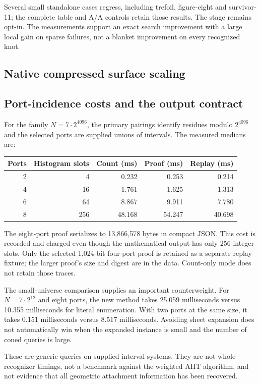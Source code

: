 Several small standalone cases regress, including trefoil, figure-eight
and survivor-11; the complete table and A/A controls retain those results.
The stage remains opt-in. The measurements support an exact search
improvement with a large local gain on sparse failures, not a blanket
improvement on every recognized knot.

\subsection{Native compressed surface scaling}


\subsection{Port-incidence costs and the output contract}

For the family $N=7\cdot2^{4096}$, the primary pairings identify residues
modulo $2^{4096}$ and the selected ports are supplied unions of intervals.
The measured medians are:
\begin{center}
\begin{tabular}{@{}rrrrr@{}}
\toprule Ports & Histogram slots & Count (ms) & Proof (ms) & Replay (ms)\\\midrule
2 & 4 & 0.232 & 0.253 & 0.214\\
4 & 16 & 1.761 & 1.625 & 1.313\\
6 & 64 & 8.867 & 9.911 & 7.780\\
8 & 256 & 48.168 & 54.247 & 40.698\\\bottomrule
\end{tabular}
\end{center}
The eight-port proof serializes to 13,866,578 bytes in compact JSON.
This cost is recorded and charged even though the mathematical output
has only 256 integer slots. Only the selected 1,024-bit four-port proof
is retained as a separate replay fixture; the larger proof's size and
digest are in the data. Count-only mode does not retain those traces.

The small-universe comparison supplies an important counterweight. For
$N=7\cdot2^{12}$ and eight ports, the new method takes 25.059 milliseconds
versus 10.355 milliseconds for literal enumeration. With two ports at the
same size, it takes 0.151 milliseconds versus 8.517 milliseconds. Avoiding
sheet expansion does not automatically win when the expanded instance
is small and the number of coned queries is large.

These are generic queries on supplied interval systems. They are not
whole-recognizer timings, not a benchmark against the weighted AHT
algorithm, and not evidence that all geometric attachment information
has been recovered.

